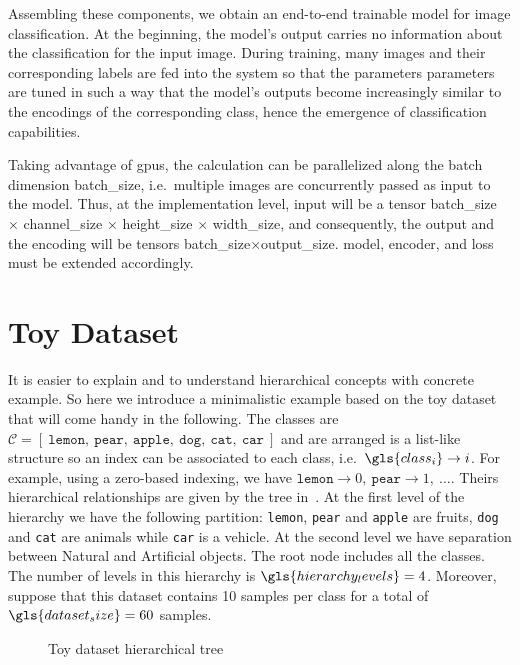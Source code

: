 Assembling these components, we obtain an end-to-end trainable model for image classification. At the beginning, the model's output carries no information about the classification for the input image. During training, many images and their corresponding labels are fed into the system so that the parameters \gls{parameters} are tuned in such a way that the model's outputs become increasingly similar to the encodings of the corresponding class, hence the emergence of classification capabilities.

Taking advantage of \acrshort{gpu}s, the calculation can be parallelized along the batch dimension \gls{batch_size}, i.e.\ multiple images are concurrently passed as input to the model. Thus, at the implementation level, \gls{input} will be a tensor \gls{batch_size} $\times$ \gls{channel_size} $\times$ \gls{height_size} $\times$ \gls{width_size}, and consequently, the output and the encoding will be tensors \gls{batch_size}$\times$\gls{output_size}. \gls{model}, \gls{encoder}, and \gls{loss} must be extended accordingly.


\section{Toy Dataset}
\label{sec:toy-dataset}

It is easier to explain and to understand hierarchical concepts with concrete example. So here we introduce a minimalistic example based on the toy dataset that will come handy in the following. The classes are $\mathcal{C} = [\ \texttt{lemon},\ \texttt{pear},\ \texttt{apple},\ \texttt{dog},\ \texttt{cat},\ \texttt{car}\ ]$ and are arranged is a list-like structure so an index can be associated to each class, i.e.\ $\gls{class_i} \to i$.
For example, using a zero-based indexing, we have $\texttt{lemon} \to 0,\ \texttt{pear} \to 1,\ \ldots$. Theirs hierarchical relationships are given by the tree in~. At the first level of the hierarchy we have the following partition: \texttt{lemon}, \texttt{pear} and \texttt{apple} are fruits, \texttt{dog} and \texttt{cat} are animals while \texttt{car} is a vehicle. At the second level we have separation between Natural and Artificial objects. The root node includes all the classes. The number of levels in this hierarchy is $\gls{hierarchy_levels} = 4$. Moreover, suppose that this dataset contains 10 samples per class for a total of $\gls{dataset_size} = 60$ samples.
\begin{figure}[htbp]
  \caption{Toy dataset hierarchical tree}
  \label{fig:03/toy-dataset}
\end{figure}

